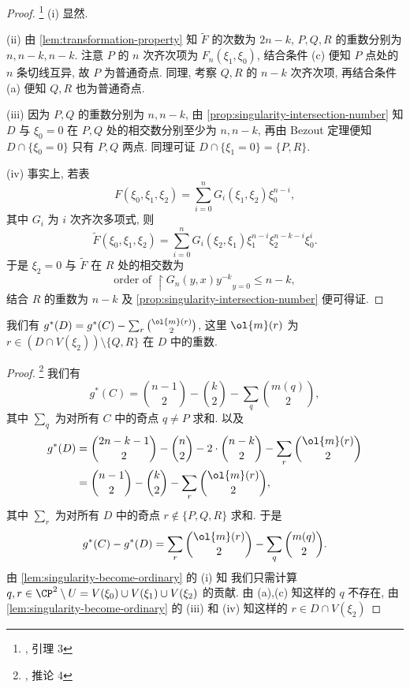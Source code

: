 \begin{proof}
\footnote{\cite{notes}, 引理 3}
(i) 显然.

(ii) 由 \cref{lem:transformation-property} 知 $\tilde{F}$ 的次数为 $2n - k$,
$P,Q,R$ 的重数分别为 $n, n-k, n-k$.
注意 $P$ 的 $n$ 次齐次项为 $F_{n}(\xi_1,\xi_0)$,
结合条件 (c) 便知 $P$ 点处的 $n$ 条切线互异,
故 $P$ 为普通奇点.
同理, 考察 $Q,R$ 的 $n-k$ 次齐次项,
再结合条件 (a) 便知 $Q,R$ 也为普通奇点.

(iii) 因为 $P,Q$ 的重数分别为 $n, n-k$,
由 \cref{prop:singularity-intersection-number} 知
$D$ 与 $\xi_0 = 0$ 在 $P,Q$ 处的相交数分别至少为 $n,n-k$,
再由 Bezout 定理便知 $D\cap \{\xi_0 = 0\}$ 只有 $P,Q$ 两点.
同理可证 $D\cap \{\xi_1 = 0\} = \{P,R\}$.

(iv) 事实上, 若表
\[F(\xi_0,\xi_1,\xi_2) = \sum_{i=0}^n G_i(\xi_1,\xi_2)\xi_0^{n-i},\]
其中 $G_i$ 为 $i$ 次齐次多项式, 则
\[\tilde{F}(\xi_0,\xi_1,\xi_2) = \sum_{i=0}^n G_i(\xi_2,\xi_1)\xi_1^{n-i}\xi_2^{n-k-i}\xi_0^i.\]
于是 $\xi_2 = 0$ 与 $\tilde{F}$ 在 $R$ 处的相交数为
\[\text{order of }\restriction{G_n(y,x)y^{-k}}_{y=0} \le n - k,\]
结合 $R$ 的重数为 $n-k$ 及 \cref{prop:singularity-intersection-number} 便可得证.
\end{proof}

\begin{cor}
\label{cor:pseudo-genus-relation}
我们有 $g^*(D) = g^*(C) - \sum_{r}\binom{\ol{m}(r)}{2}$,
这里 $\ol{m}(r)$ 为 $r\in (D\cap V(\xi_2))\setminus \{Q,R\}$ 在 $D$ 中的重数.
\end{cor}

\begin{proof}
\footnote{\cite{notes}, 推论 4} 我们有
\[g^*(C) = \binom{n-1}{2} - \binom{k}{2} - \sum_q\binom{m(q)}{2},\]
其中 $\sum_q$ 为对所有 $C$ 中的奇点 $q \ne P$ 求和. 以及
\begin{align*}
g^*(D) &= \binom{2n-k-1}{2} - \binom{n}{2} - 2\cdot\binom{n-k}{2} - \sum_r \binom{\ol{m}(r)}{2}\\
&=\binom{n-1}{2} - \binom{k}{2} - \sum_r\binom{\ol{m}(r)}{2},
\end{align*}
其中 $\sum_r$ 为对所有 $D$ 中的奇点 $r \notin \{P,Q,R\}$ 求和.
于是
\[g^*(C) - g^*(D) = \sum_r\binom{\ol{m}(r)}{2} - \sum_q\binom{m(q)}{2}.\]
由 \cref{lem:singularity-become-ordinary} 的 (i) 知
我们只需计算 $q,r \in \CP^2\setminus U = V(\xi_0)\cup V(\xi_1)\cup V(\xi_2)$ 的贡献.
由 (a),(c) 知这样的 $q$ 不存在,
由 \cref{lem:singularity-become-ordinary} 的 (iii) 和 (iv)
知这样的 $r \in D\cap V(\xi_2)$
\end{proof}

